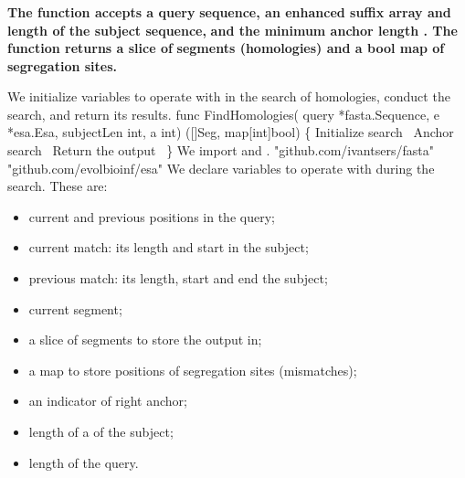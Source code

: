 \subsubsection{}
\textbf{The function  accepts a  query}
\textbf{sequence, an enhanced suffix array and length of the subject sequence,}
\textbf{and the minimum anchor length . The function returns a slice of}
\textbf{segments (homologies) and a bool map of segregation sites.}

We initialize variables to operate with in the search of homologies,
conduct the search, and return its results.
\nwenddocs{}\endmoddef\nwstartdeflinemarkup{}\nwenddeflinemarkup
func FindHomologies(
          query *fasta.Sequence,
          e *esa.Esa,
          subjectLen int,
          a int) ([]Seg, map[int]bool) \{
          \LA{}Initialize search~{\nwtagstyle{}}\RA{}
          \LA{}Anchor search~{\nwtagstyle{}}\RA{}
          \LA{}Return the output~{\nwtagstyle{}}\RA{}
\}
\nwendcode{}\nwdocspar
We import  and .
\nwenddocs{}\plusendmoddef\nwstartdeflinemarkup{}\nwenddeflinemarkup
"github.com/ivantsers/fasta"
"github.com/evolbioinf/esa"
\nwendcode{}\nwdocspar
We declare variables to operate with during the search. These are:
\begin{itemize}
\itemsep0em
\item current and previous positions in the query;
\item current match: its length and start in the subject;
\item previous match: its length, start and end the subject;
\item current segment;
\item a slice of segments to store the output in;
\item a map to store positions of segregation sites (mismatches);
\item an indicator of right anchor;
\item length of a  of the subject;
\item length of the query.
\end{itemize}

